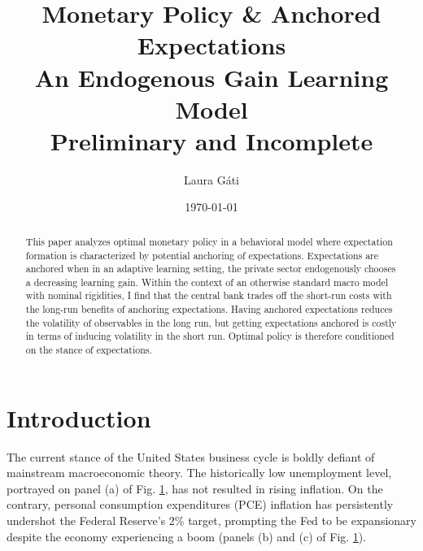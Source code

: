 \documentclass[11pt]{article}
\def \myFigPath {../../figures/}
\renewcommand{\[}{\begin{equation}}
\renewcommand{\]}{\end{equation}}
\def\mySmallerFigScale{0.18}
\begin{document}
\title{Monetary Policy \& Anchored Expectations \\
An Endogenous Gain Learning Model \\
\vspace{0.8cm}
\small{Preliminary and Incomplete}}
\author{Laura G\'ati} 
\date{\today}
\maketitle


\begin{abstract}
This paper analyzes optimal monetary policy in a behavioral model where expectation formation is characterized by potential anchoring of expectations. Expectations are anchored when in an adaptive learning setting, the private sector endogenously chooses a decreasing learning gain. Within the context of an otherwise standard macro model with nominal rigidities, I find that the central bank trades off the short-run costs with the long-run benefits of anchoring expectations. Having anchored expectations reduces the volatility of observables in the long run, but getting expectations anchored is costly in terms of inducing volatility in the short run. Optimal policy is therefore conditioned on the stance of expectations.   
\end{abstract}



\newpage
\section{Introduction}\label{introduction}

The current stance of the United States business cycle is boldly defiant of mainstream macroeconomic theory. The historically low unemployment level, portrayed on panel (a) of Fig. \ref{urate_pce_ffr}, has not resulted in rising inflation. On the contrary, personal consumption expenditures (PCE) inflation has persistently undershot the Federal Reserve's 2\% target, prompting the Fed to be expansionary despite the economy experiencing a boom (panels (b) and (c) of Fig. \ref{urate_pce_ffr}).

\begin{figure}[h!]
\caption{}
\label{urate_pce_ffr}
\end{figure}
\end{document}
